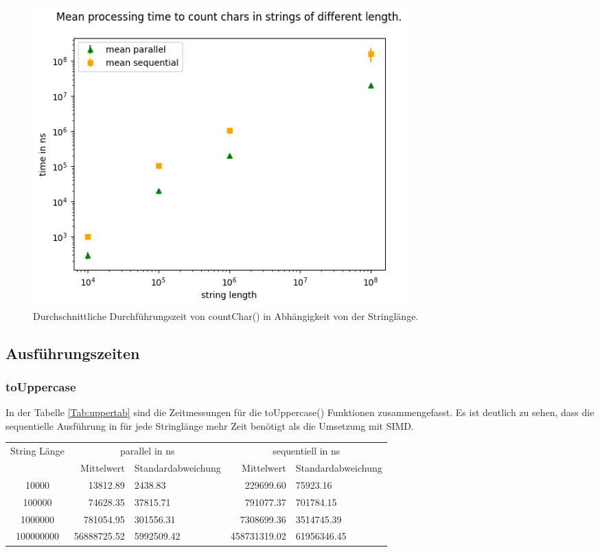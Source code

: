 \documentclass[plainarticle,zihtitle,german,final,hyperref,utf8]{zihpub}
\begin{document}
\begin{figure}[h]
	\begin{center}
		\includegraphics[width=0.7\textwidth]{images/complex_count.png}
		\caption{Durchschnittliche Durchführungszeit von countChar() in Abhängigkeit von der Stringlänge.}
		\label{fig:mean_upper}
	\end{center}
\end{figure}


\subsection{Ausführungszeiten}
\subsubsection{toUppercase}
In der Tabelle \ref{Tab:uppertab} sind die Zeitmessungen für die toUppercase() Funktionen zusammengefasst.
Es ist deutlich zu sehen, dass die se­quen­ti­elle Ausführung in für jede Stringlänge mehr Zeit benötigt als die Umsetzung mit SIMD.
\newline
\begin{tabular}{|c|r|l|r|l|}
	\hline
	\multicolumn{1}{|c|}{String Länge} & \multicolumn{2}{c|}{parallel in ns} & \multicolumn{2}{c|}{se­quen­tiell­ in ns} \\
	\cline{2-5}
	& Mittelwert & Standardabweichung  & Mittelwert & Standardabweichung \\
	\hline
	10000 & 13812.89 & 2438.83 & 229699.60 & 75923.16 \\
	100000 & 74628.35 & 37815.71 & 791077.37 & 701784.15 \\
	1000000 & 781054.95 & 301556.31 & 7308699.36 & 3514745.39 \\
	100000000 & 56888725.52 & 5992509.42 & 458731319.02 & 61956346.45 \\
	\hline
\end{tabular}
\label{Tab:uppertab}
\end{document}
